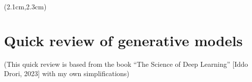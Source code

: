 \begin{preview}

\title{\vspace{-1.5cm} \bfseries\color{blue}{\LARGE AGI = RL + LLM}}

\date{\vspace{-2cm}} %

\maketitle

\setcounter{section}{-1}
\setcounter{mypage}{1}

\begin{textblock*}{5cm}(2.1cm,2.3cm) %
{\color{red}{\large \textcircled{\small \themypage}}}
\addtocounter{mypage}{1}
\end{textblock*}

\begin{minipage}{\textwidth}
\setlength{\parskip}{0.4\baselineskip}

\section{Quick review of generative models}

(This quick review is based from the book ``The Science of Deep Learning'' [Iddo Drori, 2023] with my own simplifications)


\end{minipage}
\end{preview}
